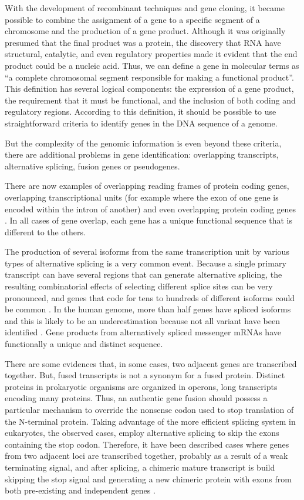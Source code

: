 With the development of recombinant techniques and gene cloning, it
became possible to combine the assignment of a gene to a specific
segment of a chromosome and the production of a gene product. Although
it was originally presumed that the final product was a protein, the
discovery that RNA have structural, catalytic, and even regulatory
properties made it evident that the end product could be a nucleic
acid. Thus, we can define a gene in molecular terms as ``a complete
chromosomal segment responsible for making a functional
product''. This definition has several logical components: the
expression of a gene product, the requirement that it must be
functional, and the inclusion of both coding and regulatory
regions. According to this definition, it should be possible to use
straightforward criteria to identify genes in the DNA sequence of a
genome.

But the complexity of the genomic information is even beyond these
criteria, there are additional problems in gene identification:
overlapping transcripts,  alternative splicing, fusion genes or 
pseudogenes. 

There are now examples of overlapping reading frames of protein coding
genes, overlapping transcriptional units (for example where the exon
of one gene is encoded within the intron of another) and even
overlapping protein coding genes \citep{coelho:2002a,tycowski:1996a}.
In all cases of gene overlap, each gene has a unique functional
sequence that is different to the others.

The production of several isoforms from the same transcription unit by
various types of alternative splicing is a very common event. Because
a single primary transcript can have several regions that can generate
alternative splicing, the resulting combinatorial effects of selecting
different splice sites can be very pronounced, and genes that code for
tens to hundreds of different isoforms could be common
\citep{graveley:2001a}. In the human genome, more than half genes
have spliced isoforms and this is likely to be an underestimation
because not all variant have been identified \citep{modrek:2002a}.
Gene products from alternatively spliced messenger mRNAs have
functionally a unique and distinct sequence.

There are some evidences that, in some cases, two adjacent genes are
transcribed together. But, fused transcripts is not a synonym for a
fused protein. Distinct proteins in prokaryotic organisms are
organized in operons, long transcripts encoding many proteins. Thus,
an authentic gene fusion should possess a particular mechanism to
override the nonsense codon used to stop translation of the N-terminal
protein. Taking advantage of the more efficient splicing system in
eukaryotes, the observed cases, employ alternative splicing to skip
the exons containing the stop codon. Therefore, it have been described
cases where genes from two adjacent loci are transcribed together,
probably as a result of a weak terminating signal, and after splicing,
a chimeric mature transcript is build skipping the stop signal and
generating a new chimeric protein with exons from both pre-existing
and independent genes \citep{thomson:2000a,poulin:2003a}.

